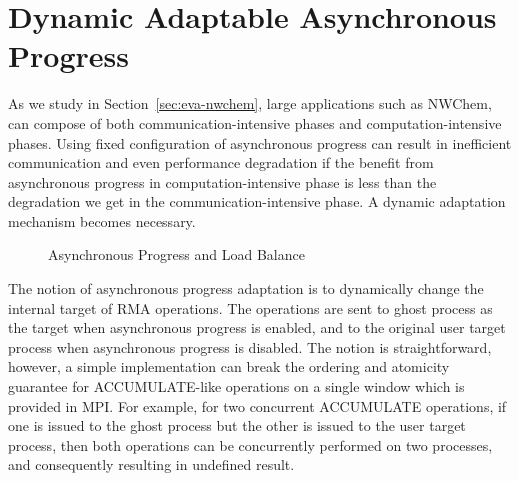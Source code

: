 \section{Dynamic Adaptable Asynchronous Progress}\label{sec:des-adpt}
As we study in Section~\ref{sec:eva-nwchem}, large applications such
as NWChem, can compose of both communication-intensive phases and
computation-intensive phases. Using fixed configuration of asynchronous
progress can result in inefficient communication and even performance
degradation if the benefit from asynchronous progress in
computation-intensive phase is less than the degradation we get in
the communication-intensive phase. A dynamic adaptation mechanism becomes
necessary.

\begin{figure}[h]
\centering
{}
\caption{Asynchronous Progress and Load Balance}
\label{fig:deg-adpt-async-load}
\end{figure}

The notion of asynchronous progress adaptation is to dynamically change
the internal target of RMA operations. The operations are sent to ghost
process as the target when asynchronous progress is enabled, and to the
original user target process when asynchronous progress is disabled.
The notion is straightforward, however, a simple implementation can
break the ordering and atomicity guarantee for ACCUMULATE-like operations
on a single window which is provided in MPI. For example, for two
concurrent ACCUMULATE operations, if one is issued to the ghost process
but the other is issued to the user target process, then both operations
can be concurrently performed on two processes, and consequently resulting
in undefined result.

